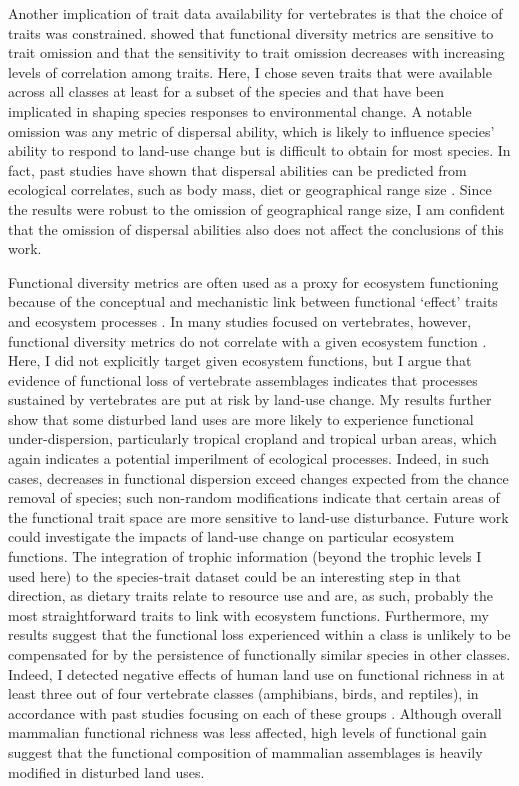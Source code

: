 Another implication of trait data availability for vertebrates is that the choice of traits was constrained. \citet{Mouillot2021} showed that functional diversity metrics are sensitive to trait omission and that the sensitivity to trait omission decreases with increasing levels of correlation among traits. Here, I chose seven traits that were available across all classes at least for a subset of the species and that have been implicated in shaping species responses to environmental change. A notable omission was any metric of dispersal ability, which is likely to influence species’ ability to respond to land-use change but is difficult to obtain for most species. In fact, past studies have shown that dispersal abilities can be predicted from ecological correlates, such as body mass, diet or geographical range size \citep{Schloss2012b, Sutherland2000}. Since the results were robust to the omission of geographical range size, I am confident that the omission of dispersal abilities also does not affect the conclusions of this work.

Functional diversity metrics are often used as a proxy for ecosystem functioning because of the conceptual and mechanistic link between functional `effect' traits and ecosystem processes \citep{Lavorel2002a, Violle2007}. In many studies focused on vertebrates, however, functional diversity metrics do not correlate with a given ecosystem function \citep{Hatfield2018}. Here, I did not explicitly target given ecosystem functions, but I argue that evidence of functional loss of vertebrate assemblages indicates that processes sustained by vertebrates are put at risk by land-use change. My results further show that some disturbed land uses are more likely to experience functional under-dispersion, particularly tropical cropland and tropical urban areas, which again indicates a potential imperilment of ecological processes. Indeed, in such cases, decreases in functional dispersion exceed changes expected from the chance removal of species; such non-random modifications indicate that certain areas of the functional trait space are more sensitive to land-use disturbance. Future work could investigate the impacts of land-use change on particular ecosystem functions. The integration of trophic information (beyond the trophic levels I used here) to the species-trait dataset could be an interesting step in that direction, as dietary traits relate to resource use and are, as such, probably the most straightforward traits to link with ecosystem functions. Furthermore, my results suggest that the functional loss experienced within a class is unlikely to be compensated for by the persistence of functionally similar species in other classes. Indeed, I detected negative effects of human land use on functional richness in at least three out of four vertebrate classes (amphibians, birds, and reptiles), in accordance with past studies focusing on each of these groups \citep{Gallmetzer2015, Marcacci2021, Riemann2017, Sol2020}. Although overall mammalian functional richness was less affected, high levels of functional gain suggest that the functional composition of mammalian assemblages is heavily modified in disturbed land uses.


